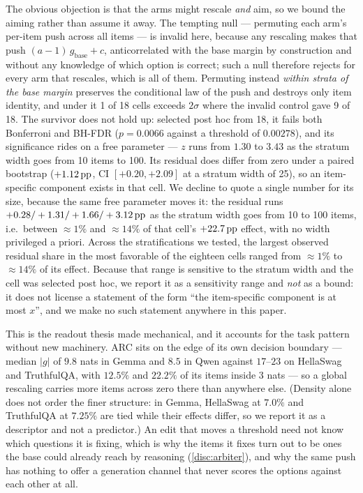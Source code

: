 The obvious objection is that the arms might rescale \emph{and} aim, so we bound the
aiming rather than assume it away. The tempting null --- permuting each arm's per-item
push across all items --- is invalid here, because any rescaling makes that push
$(a-1)\,g_{\mathrm{base}} + c$, anticorrelated with the base margin by construction and
without any knowledge of which option is correct; such a null therefore rejects for
every arm that rescales, which is all of them. Permuting instead \emph{within strata of
the base margin} preserves the conditional law of the push and destroys only item
identity, and under it 1 of 18 cells exceeds $2\sigma$ where the invalid control gave
9 of 18. The survivor does not hold up: selected post hoc from 18, it fails both
Bonferroni and BH-FDR ($p = 0.0066$ against a threshold of $0.00278$), and its
significance rides on a free parameter --- $z$ runs from $1.30$ to $3.43$ as the
stratum width goes from 10 items to 100. Its residual does differ from zero under a
paired bootstrap ($+1.12\,\mathrm{pp}$, CI $[+0.20, +2.09]$ at a stratum width of 25), so an
item-specific component exists in that cell. We decline to quote a single number for
its size, because the same free parameter moves it: the residual runs
$+0.28 / +1.31 / +1.66 / +3.12\,\mathrm{pp}$ as the stratum width goes from 10 to 100 items,
i.e.\ between ${\approx}1\%$ and ${\approx}14\%$ of that cell's $+22.7\,\mathrm{pp}$ effect, with
no width privileged a priori. Across the stratifications we tested, the largest
observed residual share in the most favorable of the eighteen cells ranged from
${\approx}1\%$ to ${\approx}14\%$ of its effect. Because that range is sensitive to
the stratum width and the cell was selected post hoc, we report it as a sensitivity
range and \emph{not} as a bound: it does not license a statement of the form ``the
item-specific component is at most $x$'', and we make no such statement anywhere in
this paper.

This is the readout thesis made mechanical, and it accounts for the task pattern
without new machinery. ARC sits on the edge of its own decision boundary --- median
$|g|$ of $9.8$ nats in Gemma and $8.5$ in Qwen against $17$--$23$ on HellaSwag and
TruthfulQA, with $12.5\%$ and $22.2\%$ of its items inside 3 nats --- so a global
rescaling carries more items across zero there than anywhere else. (Density alone does
not order the finer structure: in Gemma, HellaSwag at $7.0\%$ and TruthfulQA at
$7.25\%$ are tied while their effects differ, so we report it as a descriptor and not
a predictor.) An edit that moves a threshold need not know which questions it is
fixing, which is why the items it fixes turn out to be ones the base could already
reach by reasoning (\cref{disc:arbiter}), and why the same push has nothing to offer a
generation channel that never scores the options against each other at all.

